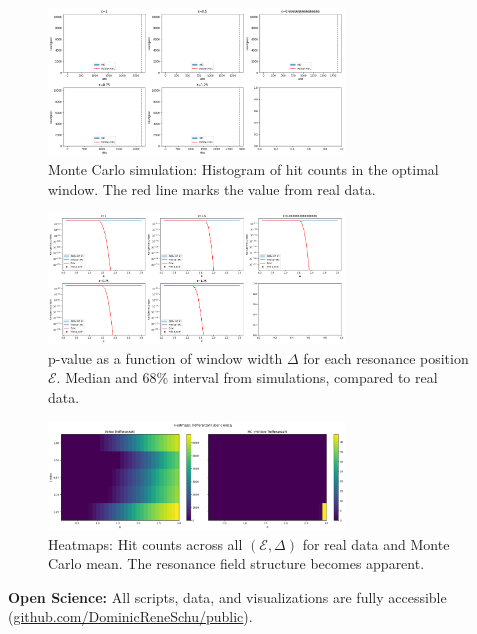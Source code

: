 \documentclass[12pt]{article}
\begin{document}
	\begin{figure}[ht]
		\centering
		\includegraphics[width=0.7\textwidth]{figures/hist_mc_vs_real_hits.png}
		\caption{Monte Carlo simulation: Histogram of hit counts in the optimal window. The red line marks the value from real data.}
		\label{fig:mc_results_hist}
	\end{figure}
	
	\begin{figure}[ht]
		\centering
		\includegraphics[width=0.7\textwidth]{figures/pvalue_curves.png}
		\caption{p-value as a function of window width $\Delta$ for each resonance position $\mathcal{E}$. Median and 68\% interval from simulations, compared to real data.}
		\label{fig:mc_results_pvalue}
	\end{figure}
	
	\begin{figure}[ht]
		\centering
		\includegraphics[width=0.7\textwidth]{figures/heatmaps_hits.png}
		\caption{Heatmaps: Hit counts across all $(\mathcal{E}, \Delta)$ for real data and Monte Carlo mean. The resonance field structure becomes apparent.}
		\label{fig:mc_results_heatmap}
	\end{figure}
	
	\textbf{Open Science:}  
	All scripts, data, and visualizations are fully accessible (\href{https://github.com/DominicReneSchu/public/tree/main/fakten/empirisch/monte_carlo_test}{github.com/DominicReneSchu/public}).
	
\end{document}
